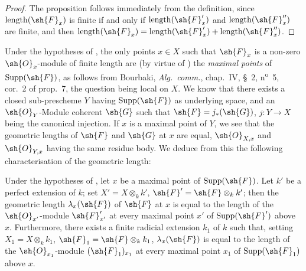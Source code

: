 \begin{proof}
The proposition follows immediately from the definition, since $\operatorname{length}(\sh{F}_x)$ is finite if and only if $\operatorname{length}(\sh{F}'_x)$ and $\operatorname{length}(\sh{F}''_x)$ are finite, and then $\operatorname{length}(\sh{F}_x) = \operatorname{length}(\sh{F}'_x) + \operatorname{length}(\sh{F}''_x)$.
\end{proof}

\begin{env}[4.7.7]
\label{IV.4.7.7}
Under the hypotheses of , the only points $x\in X$ such that $\sh{F}_x$ is a non-zero $\sh{O}_x$-module of finite length are (by virtue of ) the \emph{maximal points} of $\operatorname{Supp}(\sh{F})$, as follows from Bourbaki, \emph{Alg.\ comm.}, chap.~IV, \S~2, n\textsuperscript{o}~5, cor.~2 of prop.~7, the question being local on $X$.
We know that there exists a closed sub-prescheme $Y$ having $\operatorname{Supp}(\sh{F})$ as underlying space, and an $\sh{O}_Y$-Module coherent $\sh{G}$ such that $\sh{F}=j_*(\sh{G})$, $j:Y\to X$ being the canonical injection.
If $x$ is a maximal point of $Y$, we see that the geometric lengths of $\sh{F}$ and $\sh{G}$ at $x$ are equal, $\sh{O}_{X,x}$ and $\sh{O}_{Y,x}$ having the same residue body.
We deduce from this the following characterisation of the geometric length:
\end{env}

\begin{proposition}[4.7.8]
\label{IV.4.7.8}
Under the hypotheses of , let $x$ be a maximal point of $\operatorname{Supp}(\sh{F})$.
Let $k'$ be a perfect extension of $k$; set $X'=X\otimes_k k'$, $\sh{F}'=\sh{F}\otimes_k k'$; then the geometric length $\lambda_x(\sh{F})$ of $\sh{F}$ at $x$ is equal to the length of the $\sh{O}_{x'}$-module $\sh{F}'_{x'}$ at every maximal point $x'$ of $\operatorname{Supp}(\sh{F}')$ above $x$.
Furthermore, there exists a finite radicial extension $k_1$ of $k$ such that, setting $X_1=X\otimes_k k_1$, $\sh{F}_1=\sh{F}\otimes_k k_1$, $\lambda_x(\sh{F})$ is equal to the length of the $\sh{O}_{x_1}$-module $(\sh{F}_1)_{x_1}$ at every maximal point $x_1$ of $\operatorname{Supp}(\sh{F}_1)$ above $x$.
\end{proposition}

